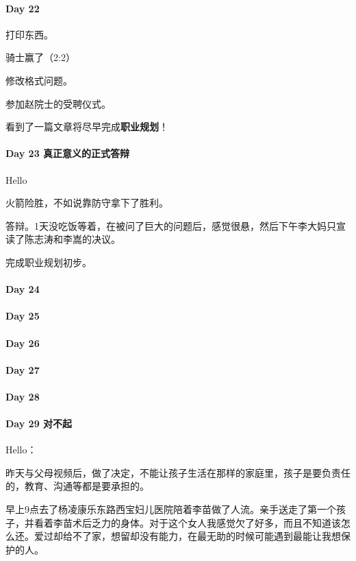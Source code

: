 \documentclass[UTF8,a4paper,8pt]{ctexart}
\begin{document}
 	 \paragraph{Day 22      \quad     }
	 	 打印东西。
	 	 
	 	 骑士赢了（2:2）
	 	 
	 	 修改格式问题。
	 	 
	 	 参加赵院士的受聘仪式。
	 	 
	 	 看到了一篇文章将尽早完成\textbf{职业规划}！
 	 \paragraph{Day 23   真正意义的正式答辩   \quad     }
	 	 Hello
	 	 
	 	 火箭险胜，不如说靠防守拿下了胜利。
	 	 
	 	 答辩。1天没吃饭等着，在被问了巨大的问题后，感觉很悬，然后下午李大妈只宣读了陈志涛和李嵩的决议。
	 	 
		 完成职业规划初步。
	 	 
 	 \paragraph{Day 24      \quad     }
 	 \paragraph{Day 25      \quad     }
 	 \paragraph{Day 26      \quad     }
 	 \paragraph{Day 27      \quad     }
 	 \paragraph{Day 28      \quad     }
 	 \paragraph{Day 29  对不起    \quad     }   
 	 	Hello：
 	 	
 	 	昨天与父母视频后，做了决定，不能让孩子生活在那样的家庭里，孩子是要负责任的，教育、沟通等都是要承担的。
 	 	
 	 	早上9点去了杨凌康乐东路西宝妇儿医院陪着李苗做了人流。亲手送走了第一个孩子，并看着李苗术后乏力的身体。对于这个女人我感觉欠了好多，而且不知道该怎么还。爱过却给不了家，想留却没有能力，在最无助的时候可能遇到最能让我想保护的人。
 	 	
\end{document}
